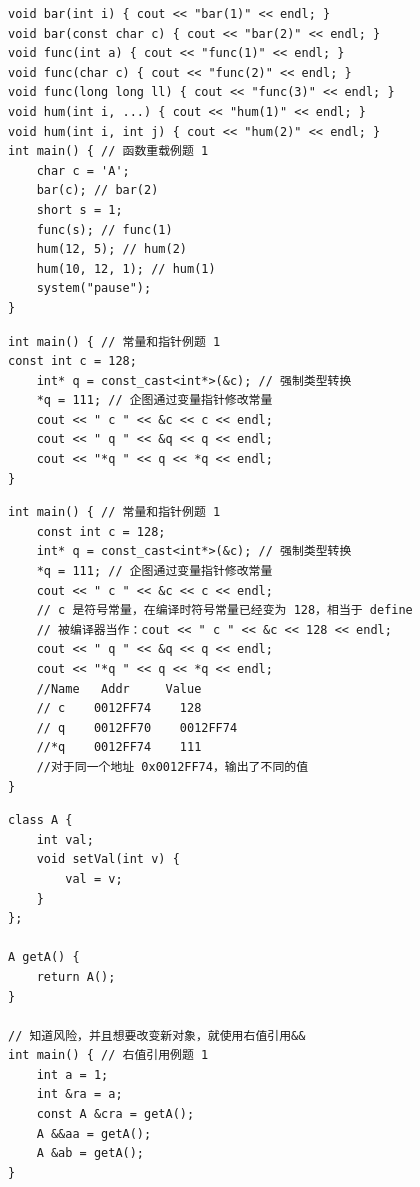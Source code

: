 \documentclass[10pt,aspectratio=169,mathserif]{beamer}
\begin{document}
\begin{frame}[fragile]
	\begin{lstlisting}
void bar(int i) { cout << "bar(1)" << endl; }
void bar(const char c) { cout << "bar(2)" << endl; }
void func(int a) { cout << "func(1)" << endl; }
void func(char c) { cout << "func(2)" << endl; }
void func(long long ll) { cout << "func(3)" << endl; }
void hum(int i, ...) { cout << "hum(1)" << endl; }
void hum(int i, int j) { cout << "hum(2)" << endl; }
int main() { // 函数重载例题 1
    char c = 'A';
    bar(c); // bar(2)
    short s = 1;
    func(s); // func(1)
    hum(12, 5); // hum(2)
    hum(10, 12, 1); // hum(1)
    system("pause");
}
\end{lstlisting}
\end{frame}

\begin{frame}[fragile]
	\begin{lstlisting}
int main() { // 常量和指针例题 1
const int c = 128;
    int* q = const_cast<int*>(&c); // 强制类型转换
    *q = 111; // 企图通过变量指针修改常量
    cout << " c " << &c << c << endl;
    cout << " q " << &q << q << endl;
    cout << "*q " << q << *q << endl;
}
\end{lstlisting}
\end{frame}

\begin{frame}[fragile]
	\begin{lstlisting}
int main() { // 常量和指针例题 1
    const int c = 128;
    int* q = const_cast<int*>(&c); // 强制类型转换
    *q = 111; // 企图通过变量指针修改常量
    cout << " c " << &c << c << endl;
    // c 是符号常量，在编译时符号常量已经变为 128，相当于 define
    // 被编译器当作：cout << " c " << &c << 128 << endl;
    cout << " q " << &q << q << endl;
    cout << "*q " << q << *q << endl;
    //Name   Addr     Value
    // c    0012FF74    128
    // q    0012FF70    0012FF74
    //*q    0012FF74    111
    //对于同一个地址 0x0012FF74，输出了不同的值
}
\end{lstlisting}
\end{frame}

\begin{frame}[fragile]
	\begin{lstlisting}
class A {
    int val;
    void setVal(int v) {
        val = v;
    }
};

A getA() {
    return A();
}

// 知道风险，并且想要改变新对象，就使用右值引用&&
int main() { // 右值引用例题 1
    int a = 1;
    int &ra = a;
    const A &cra = getA();
    A &&aa = getA();
    A &ab = getA();
}
    \end{lstlisting}
\end{frame}
\end{document}
